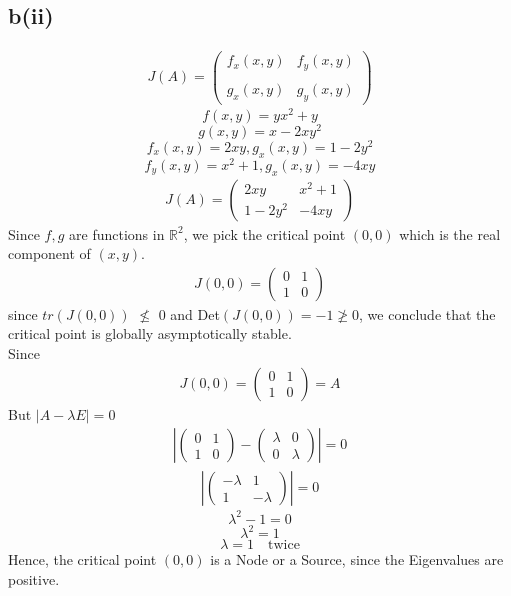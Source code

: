 \documentclass[a4paper, 12pt]{article}
\begin{document}
\subsection{b(ii)}
\begin{align*}
J(A) =
\begin{pmatrix}
f_x(x,y) & f_y(x,y) \\~\\
g_x(x,y) & g_y(x,y)
\end{pmatrix} 
\end{align*}
$$f(x,y) = yx^2 + y $$
$$g(x,y) = x - 2xy^2 $$ 
$$f_x(x,y) = 2xy , g_x(x,y) = 1-2y^2 $$ 
$$f_y(x,y) = x^2 +1 , g_x(x,y) = -4xy $$
\begin{align*}
J(A) =
\begin{pmatrix}
2xy & x^2+1 \\
1-2y^2 & -4xy
\end{pmatrix}
\end{align*}
Since $f,g$ are functions in $\mathbb{R}^2$, we pick the critical point $(0,0)$ which is the real component of $(x,y)$.
\begin{align*}
J(0,0) =
\begin{pmatrix}
0 & 1 \\
1 & 0
\end{pmatrix}
\end{align*}
since $tr(J(0,0))$ $\nleq$ 0 and Det$(J(0,0)) = -1 \ngeq 0$, we conclude that the critical point is globally asymptotically stable. \\
Since
\begin{align*}
J(0,0) =
\begin{pmatrix}
0 & 1 \\
1 & 0
\end{pmatrix} = A
\end{align*}
But $\left| A - \lambda E \right| = 0 $
\begin{align*}
\left|
\begin{pmatrix}
0 & 1 \\
1 & 0
\end{pmatrix} - 
\begin{pmatrix}
\lambda & 0 \\
0 & \lambda
\end{pmatrix} \right| = 0 
\end{align*}
\begin{align*}
\left|
\begin{pmatrix}
- \lambda & 1 \\
1 & - \lambda
\end{pmatrix} \right | = 0 
\end{align*}
$$ \lambda ^2 - 1 = 0 $$
$$ \lambda ^2 = 1 $$
$$ \lambda = 1 \quad \text{twice} $$
Hence, the critical point $(0,0)$ is a Node or a Source, since the Eigenvalues are positive.
\end{document}
